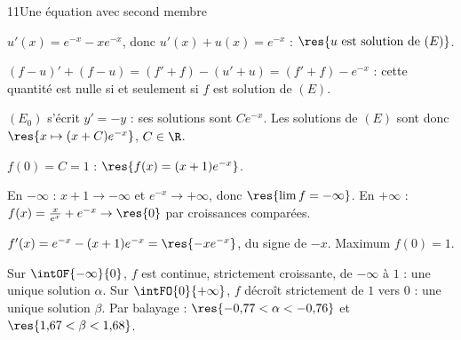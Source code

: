 \begin{corrige}{11}{Une équation avec second membre}
\begin{questions}
  \item $u'(x)=e^{-x}-xe^{-x}$, donc $u'(x)+u(x)=e^{-x}$ : $\res{u\text{ est solution de }(E)}$.
  \item $(f-u)'+(f-u)=\left(f'+f\right)-\left(u'+u\right)=\left(f'+f\right)-e^{-x}$ : cette quantité est nulle si et seulement si $f$ est
    solution de $(E)$.
  \item $(E_0)$ s'écrit $y'=-y$ : ses solutions sont $Ce^{-x}$. Les solutions de $(E)$ sont donc $\res{x\mapsto(x+C)e^{-x}}$, $C\in\R$.
  \item $f(0)=C=1$ : $\res{f(x)=(x+1)e^{-x}}$.
\end{questions}
\noindent
\begin{minipage}[t]{0.52\linewidth}\vspace{0pt}\raggedright
\begin{questions}[start=5]
  \item En $-\infty$ : $x+1\to-\infty$ et $e^{-x}\to+\infty$, donc $\res{\lim f=-\infty}$. En $+\infty$ : $f(x)=\frac{x}{e^{x}}+e^{-x}\to\res{0}$
    par croissances comparées.
  \item $f'(x)=e^{-x}-(x+1)e^{-x}=\res{-xe^{-x}}$, du signe de $-x$. Maximum $f(0)=1$.
\end{questions}
\end{minipage}\hfill
\begin{minipage}[t]{0.44\linewidth}\vspace{1mm}
\centering
\begin{tableau}
\end{tableau}
\end{minipage}
\noindent
\begin{minipage}[t]{0.52\linewidth}\vspace{0pt}\raggedright
\begin{questions}[start=7]
  \item Sur $\intOF{-\infty}{0}$, $f$ est continue, strictement croissante, de $-\infty$ à $1$ : une unique solution $\alpha$. Sur
    $\intFO{0}{+\infty}$, $f$ décroît strictement de $1$ vers $0$ : une unique solution $\beta$. Par balayage :
    $\res{-0{,}77<\alpha<-0{,}76}$ et $\res{1{,}67<\beta<1{,}68}$.

\end{questions}
\end{minipage}
\end{corrige}

